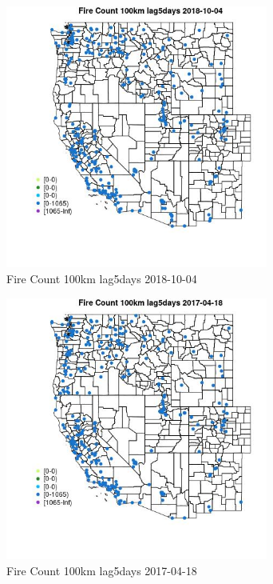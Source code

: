 \begin{figure} 
\centering  
\includegraphics[width=0.77\textwidth]{Code_Outputs/Report_ML_input_PM25_Step4_part_f_de_duplicated_aveswNAs_MapObsFire_Count_100km_lag5days2018-10-04.jpg} 
\caption{\label{fig:Report_ML_input_PM25_Step4_part_f_de_duplicated_aveswNAsMapObsFire_Count_100km_lag5days2018-10-04}Fire Count 100km lag5days 2018-10-04} 
\end{figure} 
 

\begin{figure} 
\centering  
\includegraphics[width=0.77\textwidth]{Code_Outputs/Report_ML_input_PM25_Step4_part_f_de_duplicated_aveswNAs_MapObsFire_Count_100km_lag5days2017-04-18.jpg} 
\caption{\label{fig:Report_ML_input_PM25_Step4_part_f_de_duplicated_aveswNAsMapObsFire_Count_100km_lag5days2017-04-18}Fire Count 100km lag5days 2017-04-18} 
\end{figure} 
 


